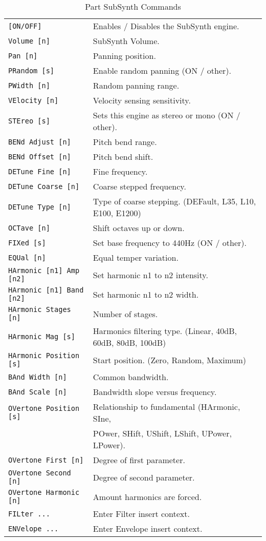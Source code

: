    \begin{table}[H]
      \centering
      \caption{Part SubSynth Commands}
      \label{table:yoshimi_part_subsynth_commands}
      \begin{tabular}{l l}

\texttt{[ON/OFF]} &
   Enables / Disables the SubSynth engine. \\
\texttt{Volume [n]} &
   SubSynth Volume.  \\
\texttt{Pan [n]} &
   Panning position.\\
\texttt{PRandom [s]} &
   Enable random panning (ON / other).\\
\texttt{PWidth [n]} &
   Random panning range.\\
\texttt{VElocity [n]} &
   Velocity sensing sensitivity. \\
\texttt{STEreo [s]} &
   Sets this engine as stereo or mono (ON / other). \\
\texttt{BENd Adjust [n]} &
   Pitch bend range. \\
\texttt{BENd Offset [n]} &
   Pitch bend shift. \\
\texttt{DETune Fine [n]} &
   Fine frequency.   \\
\texttt{DETune Coarse [n]} &
   Coarse stepped frequency.  \\
\texttt{DETune Type [n]} &
   Type of coarse stepping. (DEFault, L35, L10, E100, E1200)  \\
\texttt{OCTave [n]} &
   Shift octaves up or down.  \\
\texttt{FIXed [s]} &
   Set base frequency to 440Hz (ON / other).  \\
\texttt{EQUal [n]} &
   Equal temper variation. \\
\texttt{HArmonic [n1] Amp [n2]} &
   Set harmonic n1 to n2 intensity. \\
\texttt{HArmonic [n1] Band [n2]} &
   Set harmonic n1 to n2 width. \\
\texttt{HArmonic Stages [n]} &
   Number of stages. \\
\texttt{HArmonic Mag [s]} &
   Harmonics filtering type. (Linear, 40dB, 60dB, 80dB, 100dB)\\
\texttt{HArmonic Position [s]} &
   Start position. (Zero, Random, Maximum)\\
\texttt{BAnd Width [n]} &
   Common bandwidth. \\
\texttt{BAnd Scale [n]} &
   Bandwidth slope versus frequency. \\
\texttt{OVertone Position [s]} &
   Relationship to fundamental (HArmonic, SIne,\\
\texttt{} &
   POwer, SHift, UShift, LShift, UPower, LPower).\\
\texttt{OVertone First [n]} &
   Degree of first parameter. \\
\texttt{OVertone Second [n]} &
   Degree of second parameter.   \\
\texttt{OVertone Harmonic [n]} &
   Amount harmonics are forced.  \\
\texttt{FILter ...} &
   Enter Filter insert context.  \\
\texttt{ENVelope ...} &
   Enter Envelope insert context.   \\


\end{tabular}
\end{table}
